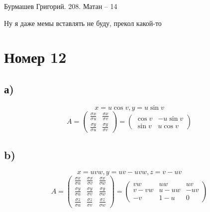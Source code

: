 \documentclass[a4paper,12pt]{article}
\author{Бурмашев Григорий, БПМИ-208}
\title{}
\date{\today}
\begin{document}
\begin{center}
Бурмашев Григорий. 208. Матан -- 14
\end{center}
\begin{center}
Ну я даже мемы вставлять не буду, прекол какой-то
\end{center}
\section*{Номер 12}
\subsection*{а)}
\[
x = u \cos v , y = u \sin v 
\]
\[
A =
\begin{pmatrix}
\frac{\sigma x}{\sigma u} & \frac{\sigma x}{\sigma v} \\
\frac{\sigma y}{\sigma u } &
\frac{\sigma y}{\sigma v}
\end{pmatrix} = 
\begin{pmatrix}
\cos v & -u \sin v\\
\sin v & u \cos v
\end{pmatrix}
\]
\subsection*{b)}
\[
x = u v w, y = uv - uvw, z = v - uv
\]
\[
A = 
\begin{pmatrix}
\frac{\sigma x}{\sigma u} & \frac{\sigma x}{\sigma v} & \frac{\sigma x}{\sigma w} \\
\frac{\sigma y}{\sigma u} & \frac{\sigma y}{\sigma v} &  \frac{\sigma y}{\sigma w} \\
\frac{\sigma z}{\sigma u} & \frac{\sigma z}{\sigma v}  &\frac{\sigma z}{\sigma w}
\end{pmatrix} = 
\begin{pmatrix}
vw & uw & uv \\v - vw & u - uw& -uv \\
 -v & 1 - u & 0 
\end{pmatrix}
\]
\end{document}
